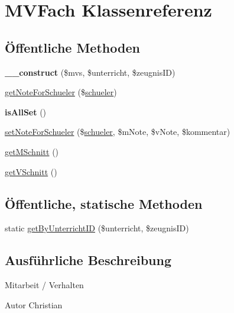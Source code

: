 \hypertarget{class_m_v_fach}{}\section{M\+V\+Fach Klassenreferenz}
\label{class_m_v_fach}
\subsection*{Öffentliche Methoden}
\begin{DoxyCompactItemize}
\item 
\mbox{\label{class_m_v_fach_a30bdeecec432ba8bb8af8dafe8d9a246}} 
{\bfseries \+\_\+\+\_\+construct} (\$mvs, \$unterricht, \$zeugnis\+ID)
\item 
\mbox{\hyperlink{class_m_v_fach_a104b7ee3fd0b05b84ad4ee6b698d2152}{get\+Note\+For\+Schueler}} (\$\mbox{\hyperlink{classschueler}{schueler}})
\item 
\mbox{\label{class_m_v_fach_a03c606412196db62569d5eb8979f74fd}} 
{\bfseries is\+All\+Set} ()
\item 
\mbox{\hyperlink{class_m_v_fach_ad2edfefedd671c3934ca2cd8485ed61c}{set\+Note\+For\+Schueler}} (\$\mbox{\hyperlink{classschueler}{schueler}}, \$m\+Note, \$v\+Note, \$kommentar)
\item 
\mbox{\hyperlink{class_m_v_fach_ae6a57013878e155f5aadd8ac66871c11}{get\+M\+Schnitt}} ()
\item 
\mbox{\hyperlink{class_m_v_fach_a288515118682a13a0f292db7b3522aed}{get\+V\+Schnitt}} ()
\end{DoxyCompactItemize}
\subsection*{Öffentliche, statische Methoden}
\begin{DoxyCompactItemize}
\item 
static \mbox{\hyperlink{class_m_v_fach_a76838e23cc646aa6d0cd6cb69ecf0bb8}{get\+By\+Unterricht\+ID}} (\$unterricht, \$zeugnis\+ID)
\end{DoxyCompactItemize}


\subsection{Ausführliche Beschreibung}
Mitarbeit / Verhalten \begin{DoxyAuthor}{Autor}
Christian 
\end{DoxyAuthor}


